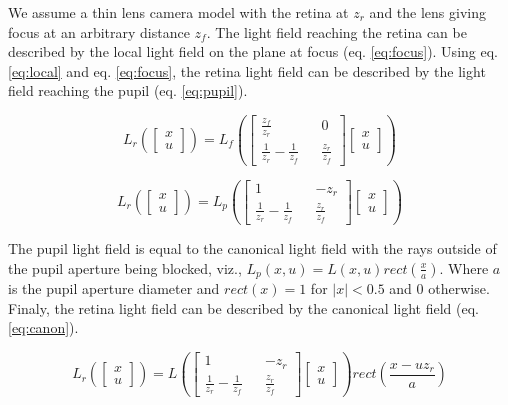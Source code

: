 \documentclass[acmtog,review,anonymous]{acmart}
\begin{document}
We assume a thin lens camera model with the retina at $z_{r}$ and the lens giving focus at an arbitrary distance $z_{f}$. The light field reaching the retina can be described by the local light field on the plane at focus (eq. \ref{eq:focus}). Using eq. \ref{eq:local} and eq. \ref{eq:focus}, the retina light field can be described by the light field reaching the pupil (eq. \ref{eq:pupil}).

\begin{equation} \label{eq:focus}
L_{r}\left(\begin{bmatrix}x\\u\end{bmatrix}\right) =
L_{f}\left(\begin{bmatrix}\frac{z_{f}}{z_{r}} && 0\\\frac{1}{z_{r}} - \frac{1}{z_{f}} && \frac{z_{r}}{z_{f}}\end{bmatrix} \begin{bmatrix}x\\u\end{bmatrix}\right)
\end{equation}

\begin{equation} \label{eq:pupil}
L_{r}\left(\begin{bmatrix}x\\u\end{bmatrix}\right) =
L_{p}\left(\begin{bmatrix}1 && -z_{r}\\\frac{1}{z_{r}} - \frac{1}{z_{f}} && \frac{z_{r}}{z_{f}}\end{bmatrix} \begin{bmatrix}x\\u\end{bmatrix}\right)
\end{equation}

The pupil light field is equal to the canonical light field with the rays outside of the pupil aperture being blocked, viz., $L_{p}(x, u) = L(x, u) rect(\frac{x}{a})$. Where $a$ is the pupil aperture diameter and $rect(x) = 1$ for $|x| < 0.5$ and $0$ otherwise. Finaly, the retina light field can be described by the canonical light field (eq. \ref{eq:canon}).

\begin{equation} \label{eq:canon}
L_{r}\left(\begin{bmatrix}x\\u\end{bmatrix}\right) =
L\left(\begin{bmatrix}1 && -z_{r}\\\frac{1}{z_{r}} - \frac{1}{z_{f}} && \frac{z_{r}}{z_{f}}\end{bmatrix} \begin{bmatrix}x\\u\end{bmatrix}\right)
rect\left(\frac{x - u z_{r}}{a}\right)
\end{equation}
\end{document}
